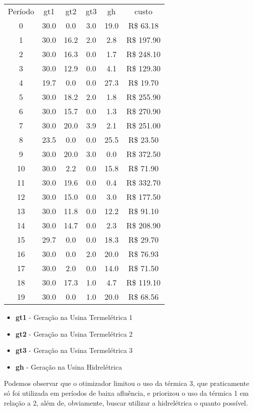\documentclass[a4paper,12pt,twoside]{article}
\begin{document}
\begin{center}
    \begin{tabular}{ c c c c c c }
        Período & gt1 & gt2 & gt3 & gh & custo \\
        0   & 30.0  &  0.0  & 3.0  & 19.0  & R\$ 63.18 \\
        1   & 30.0  & 16.2  & 2.0  &  2.8  & R\$ 197.90 \\
        2   & 30.0  & 16.3  & 0.0  &  1.7  & R\$ 248.10 \\
        3   & 30.0  & 12.9  & 0.0  &  4.1  & R\$ 129.30 \\
        4   & 19.7  &  0.0  & 0.0  & 27.3  & R\$ 19.70 \\
        5   & 30.0  & 18.2  & 2.0  &  1.8  & R\$ 255.90 \\
        6   & 30.0  & 15.7  & 0.0  &  1.3  & R\$ 270.90 \\
        7   & 30.0  & 20.0  & 3.9  &  2.1  & R\$ 251.00 \\
        8   & 23.5  &  0.0  & 0.0  & 25.5  & R\$ 23.50 \\
        9   & 30.0  & 20.0  & 3.0  &  0.0  & R\$ 372.50 \\
        10  & 30.0  &  2.2  & 0.0  & 15.8  & R\$ 71.90 \\
        11  & 30.0  & 19.6  & 0.0  &  0.4  & R\$ 332.70 \\
        12  & 30.0  & 15.0  & 0.0  &  3.0  & R\$ 177.50 \\
        13  & 30.0  & 11.8  & 0.0  & 12.2  & R\$ 91.10 \\
        14  & 30.0  & 14.7  & 0.0  &  2.3  & R\$ 208.90 \\
        15  & 29.7  &  0.0  & 0.0  & 18.3  & R\$ 29.70 \\
        16  & 30.0  &  0.0  & 2.0  & 20.0  & R\$ 76.93 \\
        17  & 30.0  &  2.0  & 0.0  & 14.0  & R\$ 71.50 \\
        18  & 30.0  & 17.3  & 1.0  &  4.7  & R\$ 119.10 \\
        19  & 30.0  &  0.0  & 1.0  & 20.0  & R\$ 68.56
    \end{tabular}
\end{center}

\begin{itemize}
    \item{\textbf{gt1} - Geração na Usina Termelétrica 1}
    \item{\textbf{gt2} - Geração na Usina Termelétrica 2}
    \item{\textbf{gt3} - Geração na Usina Termelétrica 3}
    \item{\textbf{gh} - Geração na Usina Hidrelétrica}
\end{itemize}
Podemos observar que o otimizador limitou o uso da térmica 3, que praticamente só foi utilizada
em períodos de baixa afluência, e priorizou o uso da térmica 1 em relação a 2,
além de, obviamente, buscar utilizar a hidrelétrica o quanto possível.
\end{document}
